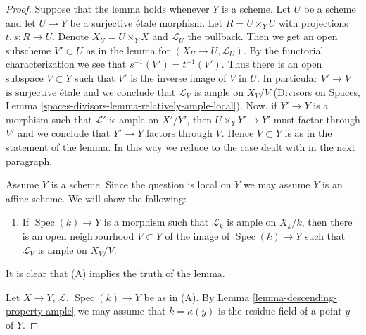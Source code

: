 \documentclass{stacks-project}
\theoremstyle{plain}
\theoremstyle{definition}
\theoremstyle{remark}
\numberwithin{equation}{subsection}
\def\Spec{\mathop{\mathrm{Spec}}}
\begin{document}
\begin{proof}
Suppose that the lemma holds whenever $Y$ is a scheme.
Let $U$ be a scheme and let $U \to Y$ be a surjective \'etale morphism.
Let $R = U \times_Y U$ with projections $t, s : R \to U$.
Denote $X_U = U \times_Y X$ and $\mathcal{L}_U$ the pullback.
Then we get an open subscheme $V' \subset U$ as in the lemma
for $(X_U \to U, \mathcal{L}_U)$. By the functorial characterization
we see that $s^{-1}(V') = t^{-1}(V')$.
Thus there is an open subspace $V \subset Y$ such that
$V'$ is the inverse image of $V$ in $U$.
In particular $V' \to V$ is surjective \'etale and we
conclude that $\mathcal{L}_V$ is ample on $X_V/V$
(Divisors on Spaces, Lemma \ref{spaces-divisors-lemma-relatively-ample-local}).
Now, if $Y' \to Y$ is a morphism such that
$\mathcal{L}'$ is ample on $X'/Y'$, then
$U \times_Y Y' \to Y'$ must factor through $V'$
and we conclude that $Y' \to Y$ factors through $V$.
Hence $V \subset Y$ is as in the statement of the lemma.
In this way we reduce to the case dealt with in the next
paragraph.

\medskip\noindent
Assume $Y$ is a scheme. Since the question is local on $Y$
we may assume $Y$ is an affine scheme. We will show the
following:
\begin{enumerate}
\item[(A)] If $\Spec(k) \to Y$ is a morphism such that
$\mathcal{L}_k$ is ample on $X_k/k$, then there is an
open neighbourhood $V \subset Y$ of the image of $\Spec(k) \to Y$
such that $\mathcal{L}_V$ is ample on $X_V/V$.
\end{enumerate}
It is clear that (A) implies the truth of the lemma.

\medskip\noindent
Let $X \to Y$, $\mathcal{L}$, $\Spec(k) \to Y$ be as in (A).
By Lemma \ref{lemma-descending-property-ample}
we may assume that $k = \kappa(y)$ is the residue field of a point $y$
of $Y$.


\end{proof}
\end{document}
